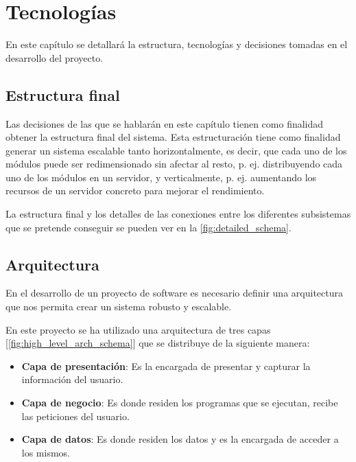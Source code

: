 \chapter{Tecnologías}
\label{sec:system}


En este capítulo se detallará la estructura, tecnologías y decisiones tomadas en el desarrollo del proyecto.


\section{Estructura final}

Las decisiones de las que se hablarán en este capítulo tienen como finalidad obtener la estructura final del sistema. Esta estructuración tiene como finalidad generar un sistema escalable tanto horizontalmente, es decir, que cada uno de los módulos puede ser redimensionado sin afectar al resto, p. ej. distribuyendo cada uno de los módulos en un servidor, y verticalmente, p. ej. aumentando los recursos de un servidor concreto para mejorar el rendimiento.

La estructura final y los detalles de las conexiones entre los diferentes subsistemas que se pretende conseguir se pueden ver en la \cref{fig:detailed_schema}.



\section{Arquitectura}
En el desarrollo de un proyecto de software es necesario definir una arquitectura que nos permita crear un sistema robusto y escalable.

En este proyecto se ha utilizado una arquitectura de tres capas [\cref{fig:high_level_arch_schema}] que se distribuye de la siguiente manera:

\begin{itemize}[noitemsep]
    \item \textbf{Capa de presentación}: Es la encargada de presentar y capturar la información del usuario.
    \item \textbf{Capa de negocio}: Es donde residen los programas que se ejecutan, recibe las peticiones del usuario.
    \item \textbf{Capa de datos}: Es donde residen los datos y es la encargada de acceder a los mismos.
\end{itemize}


